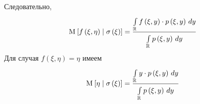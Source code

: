 Следовательно,
\begin{equation}\label{phiIntegral}
  \Mean{f\left( \xi, \eta \right) \mcond \sigma\left( \xi \right)}
  = \frac{\integral{\mathbb{R}}{}{y}{
      f\left( \xi, y \right) \cdot \pdf{\xi, y}}}{
    \integral{\mathbb{R}}{}{y}{\pdf{\xi, y}}}
\end{equation}
Для случая $f\left( \xi, \eta \right) = \eta$ имеем
\begin{equation}
  \Mean{\eta \mcond \sigma\left( \xi \right)}
  = \frac{\integral{\mathbb{R}}{}{y}{y \cdot \pdf{\xi, y}}}
    {\integral{\mathbb{R}}{}{y}{\pdf{\xi, y}}}
\end{equation}
\begin{comment}
Докажем снова, что $\varphi^\eta\left( \xi \right)$ является
условным математическим ожиданием случайной величины $\eta$
относительно $\sigma$-алгебры, порождённой случайной величиной $\xi$.
Чтобы не было скучно, будем доказывать несколько иначе, чем ранее.

\begin{lemma}[Равенство скалярных произведений
  условного математического ожидания
  случайных величин с совместной плотностью]
  Пускай имеются две случайные величины $\left( \xi, \eta \right)$
  с совместной плотностью $\pdf{x,y}$.
  \index{условное!математическое ожидание!
      случайных величин с совместной плотностью}
  Тогда функция
  $$\varphi^{\eta}\left( \xi \right)
      = \left. \frac{\integral{\mathbb{R}}{}{y}{y \cdot \pdf{x,y}}}
      {\integral{\mathbb{R}}{}{y}{\pdf{x,y}}} \right|_{x= \xi}$$

  Является условным математическим ожиданием
  $\Mean{ \eta \mcond \xi }$

\end{lemma}
\begin{proof}
Первое свойство снова очевидно, поэтому надо доказать
\begin{equation}\label{conditionalExpectationContinualStart}
  \forall A \in \sigma\left( \xi \right):
      \Mean{\varphi^{\eta}\left( \xi \right) \cdot \indicatorof{A}}
      = \Mean{ \eta \cdot \indicatorof{A} }
\end{equation}

У нас есть совместная плотность и мы хотим посчитать математическое ожидание,
пользуясь именно ею.
Для этого превратим индикатор $\indicator{\omega \in A}$
в функцию случайной величины $\xi$.
Поскольку любое событие $A$ принадлежит $\sigma\left( \xi \right)$,
то его можно представить в виде
$\xi^{-1}\left( \Delta \right), \Delta \in \mathfrak{B}$.
Перепишем индикатор следующим образом:
$\indicator{\omega \in A} = \indicator{\xi \in \Delta}$.
И вот теперь мы готовы к тому,
чтобы записать определение математического ожидания
$$\Mean{ \varphi^{\eta}\left( \xi \right) \cdot \indicatorof{A} }
  = \integral{\mathbb{R}}{}{y}{ \integral{\mathbb{R}}{}{x}{
      \varphi^{\eta}\left( x \right) \cdot \indicator{x \in \Delta}
      \cdot \pdf{x,y}}}$$


\end{comment}
